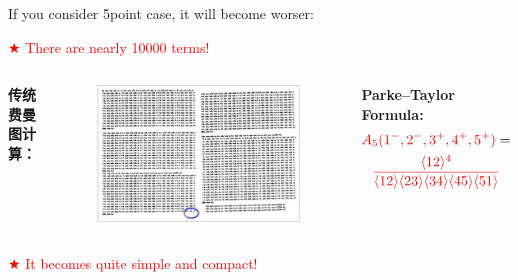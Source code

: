 \documentclass{beamer}
\begin{document}
\begin{frame}
    If you consider 5point case, it will become worser:
\begin{center}
    \textcolor{red}{$\bigstar$ There are nearly 10000 terms!}
\end{center}
\begin{columns}[T,onlytextwidth]
    \textbf{传统费曼图计算：}
    \begin{figure}
        \centering
        \includegraphics[width=\linewidth]{5pt.png}
    \end{figure}
    \pause 
    \vspace{1.5em}
    \qquad \textbf{Parke–Taylor Formula:}
    \begin{gather*}
        \textcolor{red}{A_5(1^-,2^-,3^+,4^+,5^+)} =\\
        \textcolor{red}{\frac{\langle 1 2 \rangle^4}{\langle 1 2 \rangle \langle 2 3 \rangle \langle 3 4 \rangle \langle 4 5 \rangle \langle 5 1 \rangle}}
    \end{gather*}
\end{columns}
\vspace{2em}
\textcolor{red}{$\bigstar$ \Large It becomes quite simple and compact!}
\end{frame}
\end{document}
